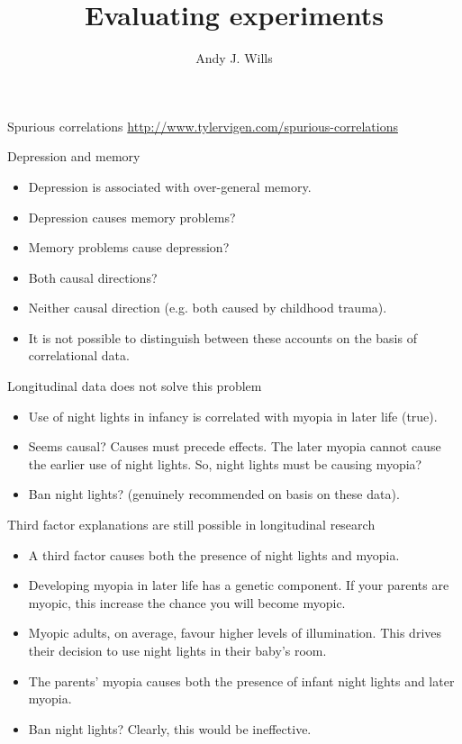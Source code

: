 \documentclass{beamer}
\title[Critical Thinking]{Evaluating experiments}
\author{Andy J. Wills}
\date{}
\begin{document}
\frame{\titlepage}

\begin{frame}{Spurious correlations}
	\url{http://www.tylervigen.com/spurious-correlations}
\end{frame}

\begin{frame}{Depression and memory}
\begin{itemize}
\item Depression is associated with over-general memory.
\vspace{12 pt}
\item Depression causes memory problems? 
\item Memory problems cause depression?
\item Both causal directions?
\item Neither causal direction (e.g. both caused by childhood trauma). 
\vspace{12 pt}
\item It is not possible to distinguish between these accounts on the basis of correlational data.
\end{itemize}
\end{frame}

\begin{frame}{Longitudinal data does not solve this problem}
\begin{itemize}
\item Use of night lights in infancy is correlated with myopia in later life (true).
\vspace{12 pt}
\item Seems causal? Causes must precede effects. The later myopia cannot cause the earlier use of night lights.
So, night lights must be causing myopia?

\item Ban night lights? (genuinely recommended on basis on these data).
\end{itemize}
\end{frame}

\begin{frame}{Third factor explanations are still possible in longitudinal research}
\begin{itemize}
\item A third factor causes both the presence of night lights and myopia.
\item Developing myopia in later life has a genetic component. If your parents are myopic, this increase the chance you will become myopic.
\item Myopic adults, on average, favour higher levels of illumination. This drives their decision to use night lights in their baby's room. 
\item The parents' myopia causes both the presence of infant night lights and later myopia.
\item Ban night lights? Clearly, this would be ineffective.
\end{itemize}
\end{frame}
\end{document}
